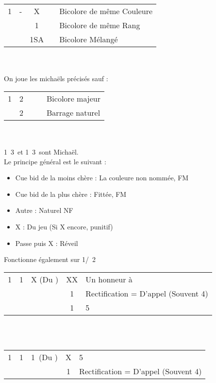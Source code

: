 \documentclass[a4paper, oneside, 11pt]{report}
\begin{document}
	\begin{tabular}{cccc|l}
	1\trefle & -  & X && Bicolore de même Couleure\\
	&& 1\carreau && Bicolore de même Rang\\
	&& 1SA && Bicolore Mélangé\\
	\end{tabular}\\\\

	On joue les michaëls précisés sauf :\\
		
	\begin{tabular}{cccc|l}
	1\trefle & 2\trefle &&& Bicolore majeur\\
	& 2\carreau &&& Barrage naturel\\
	\end{tabular}\\\\

	1\trefle\ 3\trefle\ et 1\carreau\ 3\trefle\ sont Michaël.\\

	Le principe général est le suivant :
	\begin{itemize}
	\item Cue bid de la moins chère : La couleure non nommée, FM
	\item Cue bid de la plus chère : Fittée, FM
	\item Autre : Naturel NF\\
	\item X : Du jeu (Si X encore, punitif)
	\item Passe puis X : Réveil\\
	\end{itemize}
	Fonctionne également sur 1\trefle/\carreau\ 2\carreau

	\begin{tabular}{cccc|l}
	1\trefle & 1\carreau & X (Du \coeur) & XX & Un honneur à \carreau\\
	&&& 1\coeur & Rectification = D'appel (Souvent 4\pique)\\
	&&& 1\pique & 5\pique\\
	\end{tabular}\\\\

	\begin{tabular}{cccc|l}
	1\trefle & 1\carreau & 1\coeur\ (Du \pique) & X & 5\coeur\\
	&&& 1\pique & Rectification = D'appel (Souvent 4\coeur)\\
	\end{tabular}\\\\
\end{document}

